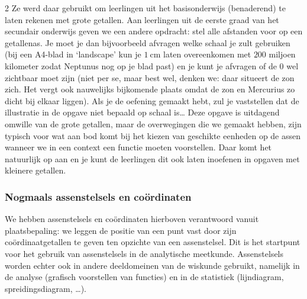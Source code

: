 \begin{multicols}{2}
Ze werd daar gebruikt om leerlingen uit het basisonderwijs (benaderend) te laten rekenen met grote getallen. Aan leerlingen uit de eerste graad van het secundair onderwijs geven we een andere opdracht: stel alle afstanden voor op een getallenas.
Je moet je dan bijvoorbeeld afvragen welke schaal je zult gebruiken (bij een A4-blad in `landscape' kun je \(\SI{1}{\centi\metre}\) laten overeenkomen met \(200\) miljoen kilometer zodat Neptunus nog op je blad past) en je kunt je afvragen of de \(0\) wel zichtbaar moet zijn (niet per se, maar best wel, denken we: daar situeert de zon zich. Het vergt ook nauwelijks bijkomende plaats omdat de zon en Mercurius zo dicht bij elkaar liggen).
Als je de oefening gemaakt hebt, zul je vaststellen dat de illustratie in de opgave niet bepaald op schaal is\ldots{}
Deze opgave is uitdagend omwille van de grote getallen, maar de overwegingen die we gemaakt hebben, zijn typisch voor wat aan bod komt bij het kiezen van geschikte eenheden op de assen wanneer we in een context een functie moeten voorstellen.
Daar komt het natuurlijk op aan en je kunt de leerlingen dit ook laten inoefenen in opgaven met kleinere getallen.

\subsubsection*{Nogmaals assenstelsels en coördinaten}
We hebben assenstelsels en coördinaten hierboven verantwoord vanuit plaatsbepaling: we leggen de positie van een punt vast door zijn coördinaatgetallen te geven ten opzichte van een assenstelsel.
Dit is het startpunt voor het gebruik van assenstelsels in de analytische meetkunde.
Assenstelsels worden echter ook in andere deeldomeinen van de wiskunde gebruikt, namelijk in de analyse (grafisch voorstellen van functies) en in de statistiek (lijndiagram, spreidingsdiagram, \ldots).


\end{multicols}

